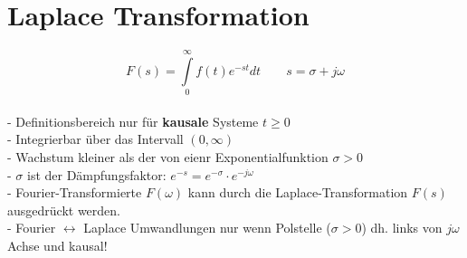 \section{Laplace Transformation}
	$$\boxed{F(s)=\int\limits_0^\infty f(t)e^{-st}dt} \qquad s=\sigma +j\omega$$\\
	- Definitionsbereich nur für \textbf{kausale} Systeme $\boxed{t\geq 0}$\\
	- Integrierbar über das Intervall $(0,\infty)$\\
	- Wachstum kleiner als der von eienr Exponentialfunktion $\boxed{\sigma > 0}$\\
	- $\sigma$ ist der Dämpfungsfaktor: $e^{-s}=e^{-\sigma} \cdot e^{-j\omega}$ \\
	- Fourier-Transformierte $F(\omega)$ kann durch die
	Laplace-Transformation $F(s)$ ausgedrückt werden.  \\
	- Fourier $\longleftrightarrow$ Laplace Umwandlungen nur wenn Polstelle
	($\sigma > 0$) dh. links von $j\omega$ Achse und kausal!
  
